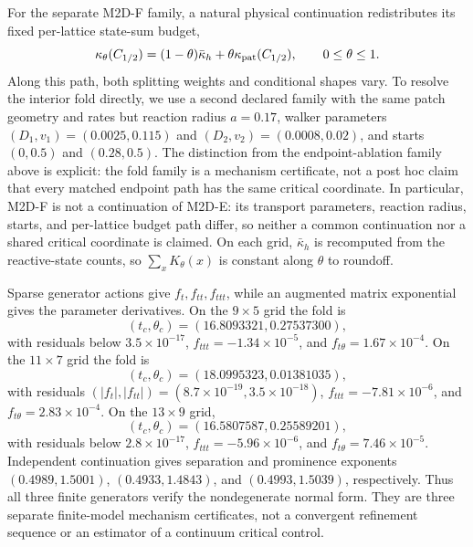 \documentclass[aps,pre,reprint,amsmath,amssymb,longbibliography,floatfix]{revtex4-2}
\begin{document}
For the separate M2D-F family, a natural physical continuation redistributes
its fixed per-lattice state-sum budget,
\begin{equation}
\kappa_\theta(C_{1/2})=(1-\theta)\bar\kappa_h
+\theta\kappa_{\rm pat}(C_{1/2}),\qquad 0\leq\theta\leq1.
\label{eq:2d-budget-path}
\end{equation}
Along this path, both splitting weights and conditional shapes vary.
To resolve the interior fold directly, we use a second declared family with
the same patch geometry and rates but reaction radius \(a=0.17\), walker
parameters \((D_1,v_1)=(0.0025,0.115)\) and
\((D_2,v_2)=(0.0008,0.02)\), and starts \((0,0.5)\) and \((0.28,0.5)\).
The distinction from the endpoint-ablation family above is explicit: the
fold family is a mechanism certificate, not a post hoc claim that every
matched endpoint path has the same critical coordinate. In particular, M2D-F
is not a continuation of M2D-E: its transport parameters, reaction radius,
starts, and per-lattice budget path differ, so neither a common continuation
nor a shared critical coordinate is claimed. On each grid,
\(\bar\kappa_h\) is recomputed from the reactive-state counts, so
\(\sum_xK_\theta(x)\) is constant along \(\theta\) to roundoff.

Sparse generator actions give \(f_t,f_{tt},f_{ttt}\), while an augmented
matrix exponential gives the parameter derivatives. On the
\(9\times5\) grid the fold is
\begin{equation}
(t_c,\theta_c)=(16.8093321,0.27537300),
\label{eq:2d-fold-9}
\end{equation}
with residuals below \(3.5\times10^{-17}\),
\(f_{ttt}=-1.34\times10^{-5}\), and
\(f_{t\theta}=1.67\times10^{-4}\). On the
\(11\times7\) grid the fold is
\begin{equation}
(t_c,\theta_c)=(18.0995323,0.01381035),
\label{eq:2d-fold-11}
\end{equation}
with residuals \((|f_t|,|f_{tt}|)=(8.7\times10^{-19},
3.5\times10^{-18})\), \(f_{ttt}=-7.81\times10^{-6}\), and
\(f_{t\theta}=2.83\times10^{-4}\). On the \(13\times9\) grid,
\begin{equation}
(t_c,\theta_c)=(16.5807587,0.25589201),
\label{eq:2d-fold-13}
\end{equation}
with residuals below \(2.8\times10^{-17}\),
\(f_{ttt}=-5.96\times10^{-6}\), and
\(f_{t\theta}=7.46\times10^{-5}\). Independent continuation gives separation
and prominence exponents \((0.4989,1.5001)\), \((0.4933,1.4843)\), and
\((0.4993,1.5039)\), respectively. Thus all three finite generators verify the
nondegenerate normal form. They are three separate finite-model mechanism
certificates, not a convergent refinement sequence or an estimator of a
continuum critical control.
\end{document}
